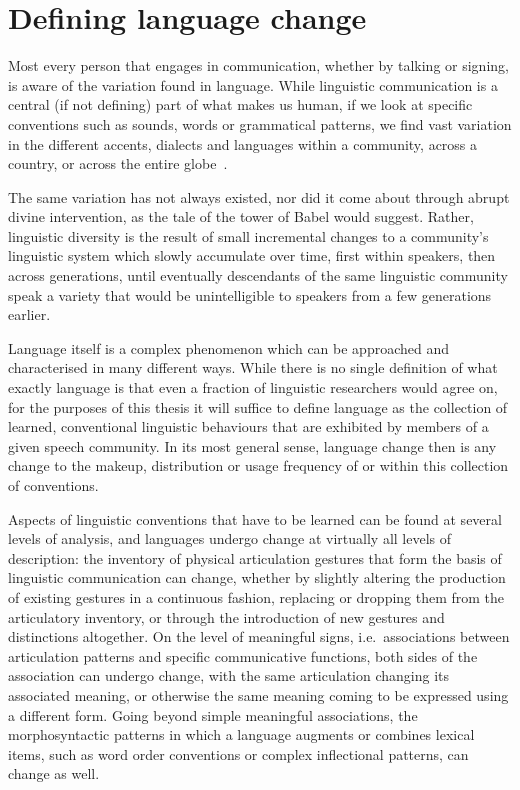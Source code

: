 \section{Defining language change}

Most every person that engages in communication, whether by talking or signing, is aware of the variation found in language. While linguistic communication is a central (if not defining) part of what makes us human, if we look at specific conventions such as sounds, words or grammatical patterns, we find vast variation in the different accents, dialects and languages within a community, across a country, or across the entire globe~\citep{Evans2009}.

The same variation has not always existed, nor did it come about through abrupt divine intervention, as the tale of the tower of Babel would suggest. Rather, linguistic diversity is the result of small incremental changes to a community's linguistic system which slowly accumulate over time, first within speakers, then across generations, until eventually descendants of the same linguistic community speak a variety that would be unintelligible to speakers from a few generations earlier.

Language itself is a complex phenomenon which can be approached and characterised in many different ways. While there is no single definition of what exactly language is that even a fraction of linguistic researchers would agree on, for the purposes of this thesis it will suffice to define language as the collection of learned, conventional linguistic behaviours %
that are exhibited by members of a given speech community. In its most general sense, language change then is any change to the makeup, distribution or usage frequency of or within this collection of conventions.

Aspects of linguistic conventions that have to be learned can be found at several levels of analysis, and languages undergo change at virtually all levels of description: the inventory of physical articulation gestures that form the basis of linguistic communication can change, whether by slightly altering the production of existing gestures in a continuous fashion, replacing or dropping them from the articulatory inventory, or through the introduction of new gestures and distinctions altogether. On the level of meaningful signs, i.e.~associations between articulation patterns and specific communicative functions, both sides of the association can undergo change, with the same articulation changing its associated meaning, or otherwise the same meaning coming to be expressed using a different form. Going beyond simple meaningful associations, the morphosyntactic patterns in which a language augments or combines lexical items, such as word order conventions or complex inflectional patterns, can change as well.

